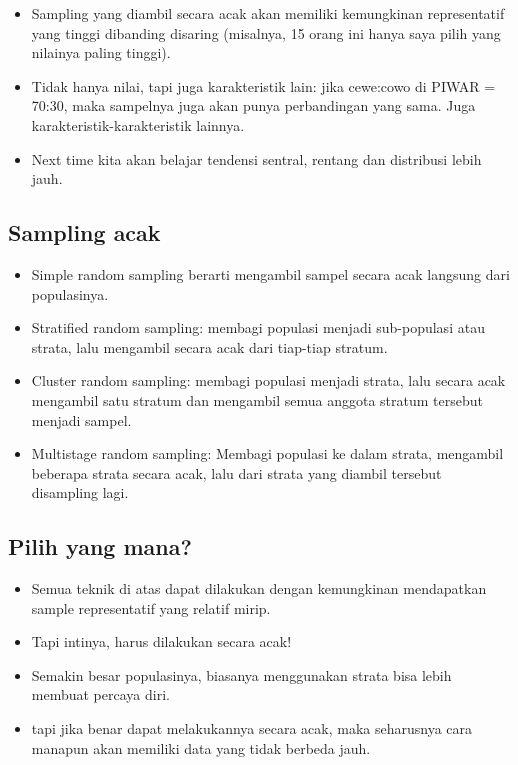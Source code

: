 \documentclass[
  letterpaper,
  DIV=11,
  numbers=noendperiod]{scrartcl}
\begin{document}
\begin{itemize}
\item
  Sampling yang diambil secara acak akan memiliki kemungkinan
  representatif yang tinggi dibanding disaring (misalnya, 15 orang ini
  hanya saya pilih yang nilainya paling tinggi).
\item
  Tidak hanya nilai, tapi juga karakteristik lain: jika cewe:cowo di
  PIWAR = 70:30, maka sampelnya juga akan punya perbandingan yang sama.
  Juga karakteristik-karakteristik lainnya.
\item
  Next time kita akan belajar tendensi sentral, rentang dan distribusi
  lebih jauh.
\end{itemize}

\subsection{Sampling acak}\label{sampling-acak}

\begin{itemize}
\item
  Simple random sampling berarti mengambil sampel secara acak langsung
  dari populasinya.
\item
  Stratified random sampling: membagi populasi menjadi sub-populasi atau
  strata, lalu mengambil secara acak dari tiap-tiap stratum.
\item
  Cluster random sampling: membagi populasi menjadi strata, lalu secara
  acak mengambil satu stratum dan mengambil semua anggota stratum
  tersebut menjadi sampel.
\item
  Multistage random sampling: Membagi populasi ke dalam strata,
  mengambil beberapa strata secara acak, lalu dari strata yang diambil
  tersebut disampling lagi.
\end{itemize}

\subsection{Pilih yang mana?}\label{pilih-yang-mana}

\begin{itemize}
\item
  Semua teknik di atas dapat dilakukan dengan kemungkinan mendapatkan
  sample representatif yang relatif mirip.
\item
  Tapi intinya, harus dilakukan secara acak!
\item
  Semakin besar populasinya, biasanya menggunakan strata bisa lebih
  membuat percaya diri.
\item
  tapi jika benar dapat melakukannya secara acak, maka seharusnya cara
  manapun akan memiliki data yang tidak berbeda jauh.
\end{itemize}
\end{document}
